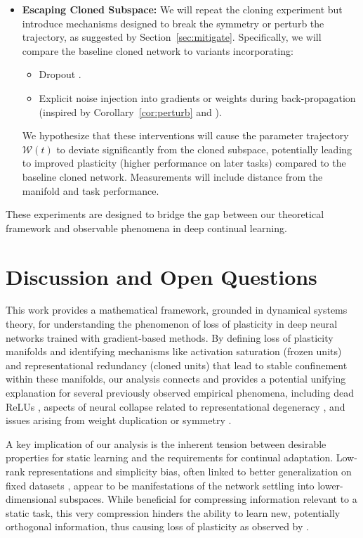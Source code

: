 \documentclass{article}
\begin{document}
\begin{itemize}
    \item \textbf{Escaping Cloned Subspace:} We will repeat the cloning experiment but introduce mechanisms designed to break the symmetry or perturb the trajectory, as suggested by Section~\ref{sec:mitigate}. Specifically, we will compare the baseline cloned network to variants incorporating:
        \begin{itemize}
            \item Dropout \cite{srivastava2014dropout}.
            \item Explicit noise injection into gradients or weights during back-propagation (inspired by Corollary~\ref{cor:perturb} and \cite{dohare2024loss}).
        \end{itemize}
        We hypothesize that these interventions will cause the parameter trajectory $\mathcal{W}(t)$ to deviate significantly from the cloned subspace, potentially leading to improved plasticity (higher performance on later tasks) compared to the baseline cloned network. Measurements will include distance from the manifold and task performance.
\end{itemize}
These experiments are designed to bridge the gap between our theoretical framework and observable phenomena in deep continual learning.

\section{Discussion and Open Questions}

This work provides a mathematical framework, grounded in dynamical systems theory, for understanding the phenomenon of loss of plasticity in deep neural networks trained with gradient-based methods. By defining loss of plasticity manifolds and identifying mechanisms like activation saturation (frozen units) and representational redundancy (cloned units) that lead to stable confinement within these manifolds, our analysis connects and provides a potential unifying explanation for several previously observed empirical phenomena, including dead ReLUs \cite{nair2010rectified}, aspects of neural collapse related to representational degeneracy \cite{papyan2020prevalence}, and issues arising from weight duplication or symmetry \cite{huh2022lowrank}.

A key implication of our analysis is the inherent tension between desirable properties for static learning and the requirements for continual adaptation. Low-rank representations and simplicity bias, often linked to better generalization on fixed datasets \cite{huh2022lowrank, papyan2020prevalence, zhang2017understanding}, appear to be manifestations of the network settling into lower-dimensional subspaces. While beneficial for compressing information relevant to a static task, this very compression hinders the ability to learn new, potentially orthogonal information, thus causing loss of plasticity as observed by \cite{dohare2024loss}.
\end{document}
